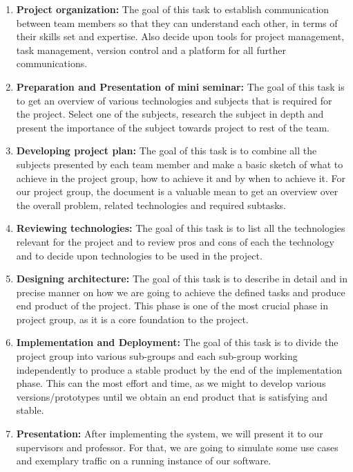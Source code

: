 \begin{enumerate}
	\item \textbf{Project organization:}
	The goal of this task to establish communication between team members so that they can understand each other, in terms of their skills set and expertise. Also decide upon tools for project management, task management, version control and a platform for all further communications.
	\item \textbf{Preparation and Presentation of mini seminar:}
	The goal of this task is to get an overview of various technologies and subjects that is required for the project. Select one of the subjects, research the subject in depth and present the importance of the subject towards project to rest of the team.
	\item \textbf{Developing project plan:}
	The goal of this task is to combine all the subjects presented by each team member and make a basic sketch of what to achieve in the project group, how to achieve it and by when to achieve it. For our project group, the document is a valuable mean to get an overview over the overall problem, related technologies and required subtasks. 
	\item \textbf{Reviewing technologies:}
	The goal of this task is to list all the technologies relevant for the project and to review pros and cons of each the technology and to decide upon technologies to be used in the project.
	\item \textbf{Designing architecture:}
	The goal of this task is to describe in detail and in precise manner on how we are going to achieve the defined tasks and produce end product of the project. This phase is one of the most crucial phase in project group, as it is a core foundation to the project.
	\item \textbf{Implementation and Deployment:}
	The goal of this task is to divide the project group into various sub-groups and each sub-group working independently to produce a stable product by the end of the implementation phase. This can the most effort and time, as we might to develop various versions/prototypes until we obtain an end product that is satisfying and stable. 
	\item \textbf{Presentation:}
	After implementing the system, we will present it to our supervisors and professor. For that, we are going to simulate some use cases and exemplary traffic on a running instance of our software.
	\end{enumerate}

